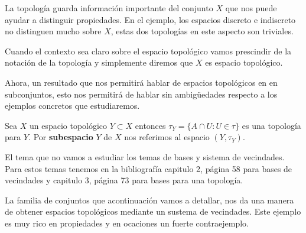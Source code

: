 La topología guarda información importante del conjunto $X$ que nos puede ayudar a distinguir propiedades. En el ejemplo, los espacios discreto e indiscreto no distinguen mucho sobre $X$, estas dos topologías en este aspecto son triviales.

\begin{cn}
Cuando el contexto sea claro sobre el espacio topológico vamos prescindir de la notación de la topología y simplemente diremos que $X$ es espacio topológico. 
\end{cn}

Ahora, un resultado que nos permitirá hablar de espacios topológicos en en subconjuntos, esto nos permitirá de hablar sin ambigüedades respecto a los ejemplos concretos que estudiaremos. 

\begin{te}
Sea $X$ un espacio topológico $Y \subset X$ entonces $\tau_Y =\{A \cap U: U \in \tau\}$ es una topología para $Y$. Por \textbf{subespacio} $Y$ de $X$ nos referimos al espacio $(Y, \tau_Y)$.
\end{te}

\begin{cn}
El tema que no vamos a estudiar los temas de bases y sistema de vecindades. Para estos temas tenemos en la bibliografía \cite{top_prieto} capitulo 2, página 58 para bases de vecindades y capitulo 3, página 73 para bases para una topología.
\end{cn}

La familia de conjuntos que acontinuación vamos a detallar, nos da una manera de obtener espacios topológicos mediante un sustema de vecindades. Este ejemplo es muy rico en propiedades y en ocaciones un fuerte contraejemplo. 



